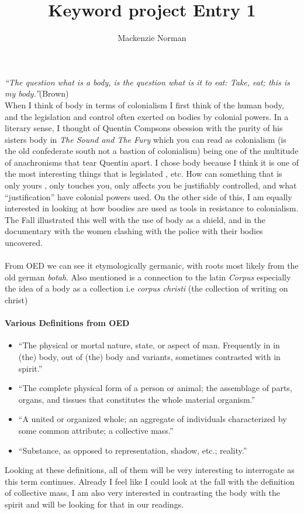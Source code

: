 \documentclass{article}
\title{Keyword project Entry 1}
\author{Mackenzie Norman}
\date{}
\begin{document}
\maketitle
\textit{``The question what is a body, is the question what is it to eat: Take, eat; this is my body.''}(Brown) \\


When I think of body in terms of colonialism I first think of the human body, and the legislation and control often exerted on bodies by colonial powers. In a literary sense, I thought of Quentin Compsons obession with the purity of his sisters body in \textit{The Sound and The Fury} which you can read as colonialism (is the old confederate south not a bastion of colonialism) being one of the multitude of anachronisms that tear Quentin apart. I chose body because I think it is one of the most interesting things that is legislated , etc. How can something that is only yours , only touches you, only affects you be justifiably controlled, and what ``justification'' have colonial powers used. 
On the other side of this, I am equally interested in looking at how boodies are used as tools in resistance to colonialism. The Fall illustrated this well with the use of body as a shield, and in the documentary with the women clashing with the police with their bodies uncovered.

\paragraph{}
From OED we can see it etymologically germanic, with roots most likely from the old german \textit{botah}. Also mentioned is a connection to the latin \textit{Corpus} especially the idea of a body as a collection i.e \textit{corpus christi} (the collection of writing on christ)
\paragraph{Various Definitions from OED}
\begin{itemize}
\item ``The physical or mortal nature, state, or aspect of man. Frequently in in (the) body, out of (the) body and variants, sometimes contrasted with in spirit.''

\item``The complete physical form of a person or animal; the assemblage of parts, organs, and tissues that constitutes the whole material organism.''

\item``A united or organized whole; an aggregate of individuals characterized by some common attribute; a collective mass.''

\item``Substance, as opposed to representation, shadow, etc.; reality.''

\end{itemize}
Looking at these definitions, all of them will be very interesting to interrogate as this term continues. Already I feel like I could look at the fall with the definition of collective mass, I am also very interested in contrasting the body with the spirit and will be looking for that in our readings.
\end{document}
